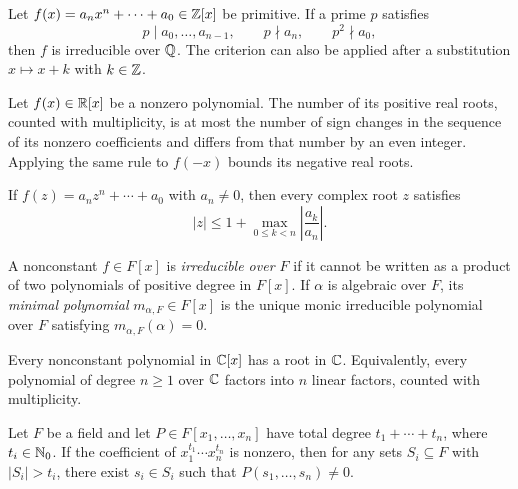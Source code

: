 \begin{theorem}
Let $f(x)=a_nx^n+\cdots+a_0\in\mathbb{Z}[x]$ be primitive. If a prime $p$ satisfies
\[
 p\mid a_0, \dots, a_{n-1}, \qquad p\nmid a_n,
 \qquad p^2\nmid a_0,
\]
then $f$ is irreducible over $\mathbb{Q}$. The criterion can also be applied after a substitution $x\mapsto x+k$ with $k\in\mathbb{Z}$.
\end{theorem}

\begin{theorem}
Let $f(x)\in\mathbb{R}[x]$ be a nonzero polynomial. The number of its positive real roots, counted with multiplicity, is at most the number of sign changes in the sequence of its nonzero coefficients and differs from that number by an even integer. Applying the same rule to $f(-x)$ bounds its negative real roots.
\end{theorem}

\begin{theorem}
If $f(z)=a_nz^n+\cdots+a_0$ with $a_n\ne0$, then every complex root $z$ satisfies
\[
 |z|\le 1+\max_{0\le k<n}\left|\frac{a_k}{a_n}\right|.
\]
\end{theorem}

\begin{definition}
A nonconstant $f\in F[x]$ is \emph{irreducible over $F$} if it cannot be written as a product of two polynomials of positive degree in $F[x]$. If $\alpha$ is algebraic over $F$, its \emph{minimal polynomial} $m_{\alpha, F}\in F[x]$ is the unique monic irreducible polynomial over $F$ satisfying $m_{\alpha, F}(\alpha)=0$.
\end{definition}

\begin{theorem}
Every nonconstant polynomial in $\mathbb{C}[x]$ has a root in $\mathbb{C}$. Equivalently, every polynomial of degree $n\ge1$ over $\mathbb{C}$ factors into $n$ linear factors, counted with multiplicity.
\end{theorem}

\begin{theorem}
Let $F$ be a field and let $P\in F[x_1, \dots, x_n]$ have total degree $t_1+\cdots+t_n$, where $t_i\in\mathbb{N}_0$. If the coefficient of $x_1^{t_1}\cdots x_n^{t_n}$ is nonzero, then for any sets $S_i\subseteq F$ with $|S_i|>t_i$, there exist $s_i\in S_i$ such that $P(s_1, \dots, s_n)\ne0$.
\end{theorem}


